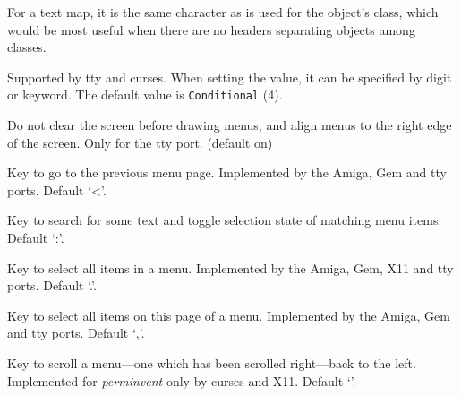\documentclass[titlepage]{article}
\begin{document}
\begin{description}[font=\mdseries\itshape]
For a text map, it is the same character as is used for the object's
class, which would be most useful when there are no headers separating
objects among classes.

Supported by tty and curses.
When setting the value, it can be specified by digit or keyword.
The default value is \texttt{Conditional} (4).
\item[menu\textunderscore overlay]
Do not clear the screen before drawing menus, and align
menus to the right edge of the screen. Only for the tty port.
(default on)
\item[menu\textunderscore previous\textunderscore page]
Key to go to the previous menu page.
Implemented by the Amiga, Gem and tty ports.
Default `<'.
\item[menu\textunderscore search]
Key to search for some text and toggle selection state of matching menu items.
Default `:'.
\item[menu\textunderscore select\textunderscore all]
Key to select all items in a menu.
Implemented by the Amiga, Gem, X11 and tty ports.
Default `.'.
\item[menu\textunderscore select\textunderscore page]
Key to select all items on this page of a menu.
Implemented by the Amiga, Gem and tty ports.
Default `,'.

\item[menu\textunderscore shift\textunderscore left]
Key to scroll a menu---one which has been
scrolled right---back to the left.
Implemented for \textit{perm\textunderscore invent} only by curses and X11.
Default `\texttt{\textbraceleft}'.


\end{description}
\end{document}
